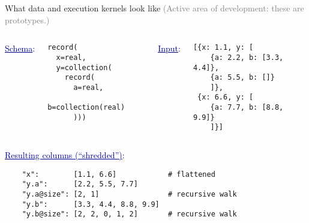 \documentclass{beamer}
\begin{document}
\begin{frame}[fragile]{What data and execution kernels look like}
\vspace{0.5 cm}
\textcolor{gray}{(Active area of development: these are prototypes.)}
\small

\vspace{0.5 cm}
\begin{columns}
\textcolor{darkblue}{\normalsize \underline{Schema}:}
\vspace{-0.1 cm}
\begin{verbatim}
record(
  x=real,
  y=collection(
    record(
      a=real,
      b=collection(real)
      )))
\end{verbatim}

\textcolor{darkblue}{\normalsize \underline{Input}:}
\vspace{-0.1 cm}
\begin{verbatim}
[{x: 1.1, y: [
    {a: 2.2, b: [3.3, 4.4]},
    {a: 5.5, b: []}
    ]},
 {x: 6.6, y: [
    {a: 7.7, b: [8.8, 9.9]}
    ]}]
\end{verbatim}
\end{columns}

\vspace{0.5 cm}
\textcolor{darkblue}{\normalsize \underline{Resulting columns (``shredded'')}:}
\vspace{-0.1 cm}
\begin{verbatim}
    "x":        [1.1, 6.6]            # flattened
    "y.a":      [2.2, 5.5, 7.7]
    "y.a@size": [2, 1]                # recursive walk
    "y.b":      [3.3, 4.4, 8.8, 9.9]
    "y.b@size": [2, 2, 0, 1, 2]       # recursive walk
\end{verbatim}
\end{frame}
\end{document}
